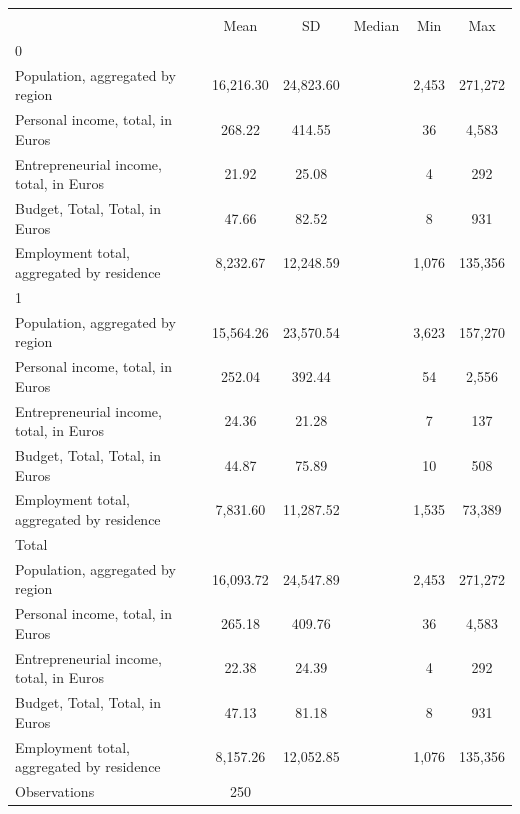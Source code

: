 {
\def\sym#1{\ifmmode^{#1}\else\(^{#1}\)\fi}
\begin{tabular}{l*{1}{ccccc}}
\toprule
                &\multicolumn{5}{c}{}                             \\
                &\multicolumn{1}{c}{{Mean}}&\multicolumn{1}{c}{{SD}}&\multicolumn{1}{c}{{Median}}&\multicolumn{1}{c}{{Min}}&\multicolumn{1}{c}{{Max}}\\
\midrule
0               &         &         &         &         &         \\
Population, aggregated by region&16,216.30&24,823.60&         &    2,453&  271,272\\
Personal income, total, in Euros&   268.22&   414.55&         &       36&    4,583\\
Entrepreneurial income, total, in Euros&    21.92&    25.08&         &        4&      292\\
Budget, Total, Total, in Euros&    47.66&    82.52&         &        8&      931\\
Employment total, aggregated by residence& 8,232.67&12,248.59&         &    1,076&  135,356\\
\midrule
1               &         &         &         &         &         \\
Population, aggregated by region&15,564.26&23,570.54&         &    3,623&  157,270\\
Personal income, total, in Euros&   252.04&   392.44&         &       54&    2,556\\
Entrepreneurial income, total, in Euros&    24.36&    21.28&         &        7&      137\\
Budget, Total, Total, in Euros&    44.87&    75.89&         &       10&      508\\
Employment total, aggregated by residence& 7,831.60&11,287.52&         &    1,535&   73,389\\
\midrule
Total           &         &         &         &         &         \\
Population, aggregated by region&16,093.72&24,547.89&         &    2,453&  271,272\\
Personal income, total, in Euros&   265.18&   409.76&         &       36&    4,583\\
Entrepreneurial income, total, in Euros&    22.38&    24.39&         &        4&      292\\
Budget, Total, Total, in Euros&    47.13&    81.18&         &        8&      931\\
Employment total, aggregated by residence& 8,157.26&12,052.85&         &    1,076&  135,356\\
\midrule
Observations    &      250&         &         &         &         \\
\bottomrule
\end{tabular}
}
